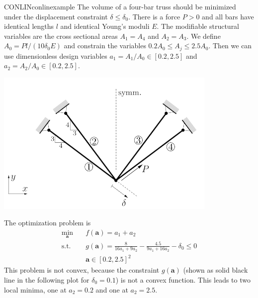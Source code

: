 \begin{example}{CONLIN}{conlinexample}
    The volume of a four-bar truss \cite{Christensen2008} should be minimized under the displacement constraint $\delta \le \delta_0$. There is a force $P>0$ and all bars have identical lengths $l$ and identical Young's moduli $E$. The modifiable structural variables are the cross sectional areas $A_1=A_4$ and $A_2=A_3$. We define $A_0 = Pl / (10\delta_0E)$ and constrain the variables $0.2A_0 \le A_j \le 2.5 A_0$. Then we can use dimensionless design variables $a_1=A_1/A_0 \in [0.2, 2.5]$ and $a_2=A_2/A_0 \in [0.2, 2.5]$.
    \begin{center}
        \includegraphics[width=0.8\textwidth]{figures/four_bar_truss_transparent.png}
    \end{center}
    The optimization problem is 
    \begin{equation}
        \begin{aligned}
            \min_{\mathbf{a}} \quad & f(\mathbf{a})= a_1 + a_2\\
            \textrm{s.t.} \quad     & g(\mathbf{a}) = \frac{8}{16a_1+9a_2} - \frac{4.5}{9a_1+16a_2} - \delta_0 \le 0  \\
            \quad     & \mathbf{a} \in [0.2,2.5]^2
        \end{aligned}
    \end{equation}
    This problem is not convex, because the constraint $g(\mathbf{a})$ (shown as solid black line in the following plot for $\delta_0=0.1$) is not a convex function. This leads to two local minima, one at $a_2=0.2$ and one at $a_2=2.5$.
    \begin{center}
        
    \end{center}
    

\end{example}
